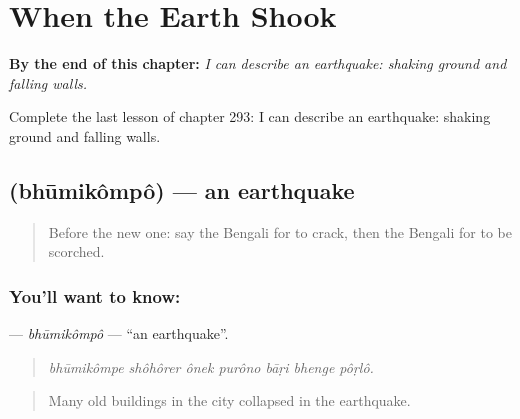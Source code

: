 
\chapter{When the Earth Shook}
\label{ch:bn-when-the-earth-shook}

\begin{chapteropening}
\textbf{By the end of this chapter:} \emph{I can describe an earthquake: shaking ground and falling walls.}

Complete the last lesson of chapter 293: I can describe an earthquake: shaking ground and falling walls.
\end{chapteropening}

\section[\texorpdfstring{\bn{ভূমিকম্প} (bhūmikômpô)}{ভূমিকম্প (bhūmikômpô)}]{ (bhūmikômpô) — an earthquake}

\label{lesson:BN-C293-bhumikompo}



\begin{quote}
Before the new one: say the Bengali for to crack, then the Bengali for to be scorched.
\end{quote}

\subsection*{You'll want to know: }
\textbf{} — \emph{bhūmikômpô} — \textquotedblleft{}an earthquake\textquotedblright{}.

\begin{quote}
      
\end{quote}

\begin{quote}
\emph{bhūmikômpe shôhôrer ônek purôno bāṛi bhenge pôṛlô.}
\end{quote}

\begin{quote}
Many old buildings in the city collapsed in the earthquake.
\end{quote}

